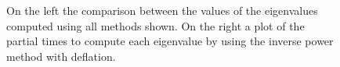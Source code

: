 \begin{figure}[H]
    \caption{On the left the comparison between the values of the eigenvalues computed using all methods shown. On the right a plot of the partial times to compute each eigenvalue by using the inverse power method with deflation.}
    \label{Eigenvalues_comp}
\end{figure}


